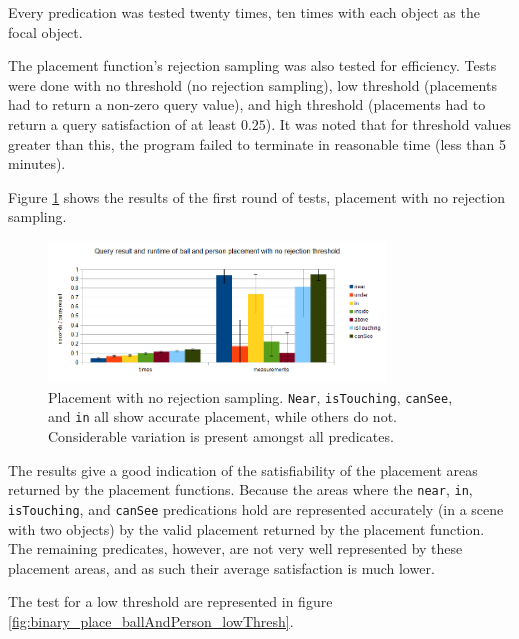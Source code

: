 Every predication was tested twenty times, ten times with each object as the focal object.

The placement function's rejection sampling was also tested for efficiency. Tests were done with no threshold (no rejection sampling), low threshold (placements had to return a non-zero query value), and high threshold (placements had to return a query satisfaction of at least $0.25$). It was noted that for threshold values greater than this, the program failed to terminate in reasonable time (less than 5 minutes). 

Figure \ref{fig:binary_place_ballAndPerson_noThresh} shows the results of the first round of tests, placement with no rejection sampling. 

\begin{figure}[h]
	\begin{center}
		\includegraphics[width=0.8\textwidth]{figures/binary_place_ballAndPerson_noThresh.png}
	\end{center}
	\caption{Placement with no rejection sampling. \texttt{Near}, \texttt{isTouching}, \texttt{canSee}, and \texttt{in} all show accurate placement, while others do not. Considerable variation is present amongst all predicates.}
	\label{fig:binary_place_ballAndPerson_noThresh}
\end{figure}

The results give a good indication of the satisfiability of the placement areas returned by the placement functions. Because the areas where the \texttt{near}, \texttt{in}, \texttt{isTouching}, and \texttt{canSee} predications hold are represented accurately (in a scene with two objects) by the valid placement returned by the placement function. The remaining predicates, however, are not very well represented by these placement areas, and as such their average satisfaction is much lower.

The test for a low threshold are represented in figure \ref{fig:binary_place_ballAndPerson_lowThresh}. 


